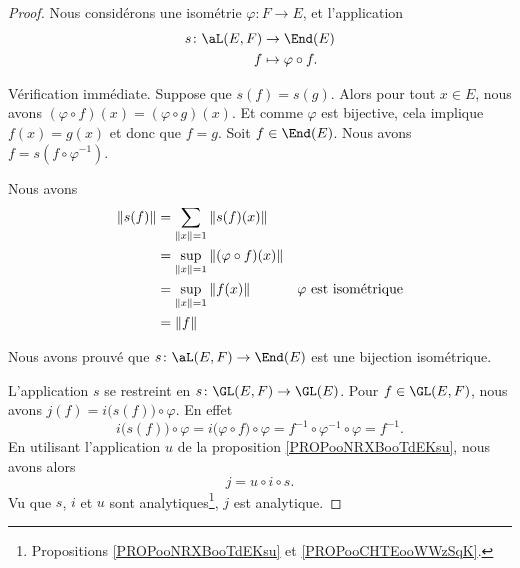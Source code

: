 \begin{proof}
	Nous considérons une isométrie \(\varphi \colon F\to E  \), et l'application
	\begin{equation}
		\begin{aligned}
			s\colon  \aL(E,F) & \to \End(E)             \\
			f                 & \mapsto \varphi\circ f.
		\end{aligned}
	\end{equation}
	\begin{subproof}
		Vérification immédiate.
		Suppose que \( s(f)=s(g)\). Alors pour tout \( x\in E\), nous avons \( (\varphi\circ f)(x)=(\varphi\circ g)(x)\). Et comme \( \varphi\) est bijective, cela implique \( f(x)=g(x)\) et donc que \( f=g\).
		Soit \( f\in\End(E)\). Nous avons \( f=s(f\circ\varphi^{-1})\).

		Nous avons
		\begin{subequations}
			\begin{align}
				\| s(f) \| & =\sum_{\| x \|=1}\| s(f)(x)  \|                                                  \\
				           & =\sup_{\| x \|=1}\| (\varphi\circ f)(x) \|                                       \\
				           & =\sup_{\| x \|=1}\| f(x) \|                & \text{\( \varphi\) est isométrique} \\
				           & =\| f \|
			\end{align}
		\end{subequations}
	\end{subproof}
	Nous avons prouvé que \(s \colon \aL(E,F)\to \End(E)  \) est une bijection isométrique.

	L'application \( s\) se restreint en \(s \colon \GL(E,F)\to \GL(E)  \). Pour \( f\in \GL(E,F) \), nous avons \( j(f)=  i\big( s(f) \big)\circ\varphi \). En effet
	\begin{equation}
		i\big( s(f) \big)\circ\varphi=i\big( \varphi\circ f \big)\circ\varphi=f^{-1}\circ\varphi^{-1}\circ\varphi=f^{-1}.
	\end{equation}
	En utilisant l'application \( u\) de la proposition \ref{PROPooNRXBooTdEKsu}, nous avons alors
	\begin{equation}
		j=u\circ i\circ s.
	\end{equation}
	Vu que \( s\), \( i\) et \( u\) sont analytiques\footnote{Propositions \ref{PROPooNRXBooTdEKsu} et \ref{PROPooCHTEooWWzSqK}.}, \( j\) est analytique.
\end{proof}



